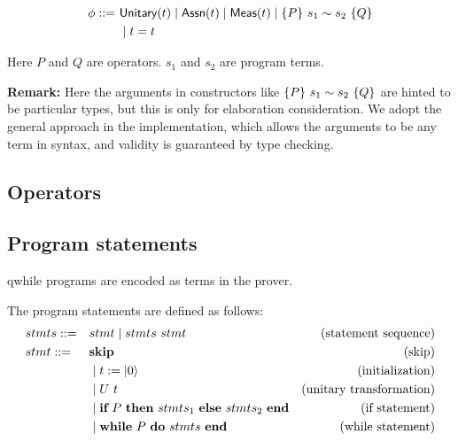 \newcommand{\assert}[1]{\ensuremath{\textsf{assert}(#1)}}
\newcommand{\pf}{\textsf{proof}}


\begin{definition}
    \label{def:prop syntax}
    \begin{align*}
        \phi ::=\ & \textsf{Unitary}({t}) \mid \textsf{Assn}(t) \mid \textsf{Meas}(t) \mid \{P\}~s_1 \sim s_2~\{Q\} \\
                & \mid t = t
    \end{align*}
\end{definition}
Here $P$ and $Q$ are operators. $s_1$ and $s_2$ are program terms.

\textbf{Remark:} Here the arguments in constructors like $\{P\}~s_1 \sim s_2~\{Q\}$ are hinted to be particular types, but this is only for elaboration consideration. We adopt the general approach in the implementation, which allows the arguments to be any term in syntax, and validity is guaranteed by type checking.

\subsection{Operators}

\subsection{Program statements}
qwhile programs are encoded as terms in the prover.

\newcommand{\Skip}{\textbf{skip}}
\newcommand{\Init}[1]{\ensuremath{#1:=\ket{0}}}
\newcommand{\If}[3]{\ensuremath{
    \textbf{if}\ #1\ \textbf{then}\ #2\ \textbf{else}\ #3\ \textbf{end}
}}
\newcommand{\While}[2]{\ensuremath{
    \textbf{while}\ #1\ \textbf{do}\ #2\ \textbf{end}
}}

\begin{definition}
    \label{def: prog syntax}
    The program statements are defined as follows:
    \begin{align*}
        & stmts ::= && stmt \mid stmts\ stmt & \text{(statement sequence)} \\
        & stmt ::= && \Skip & \text{(skip)} \\
            & && \mid \Init{t} & \text{(initialization)} \\
            & && \mid U\ t & \text{(unitary transformation)} \\
            & && \mid \If{P}{stmts_1}{stmts_2} & \text{(if statement)} \\
            & && \mid \While{P}{stmts} & \text{(while statement)}
    \end{align*}
\end{definition}


